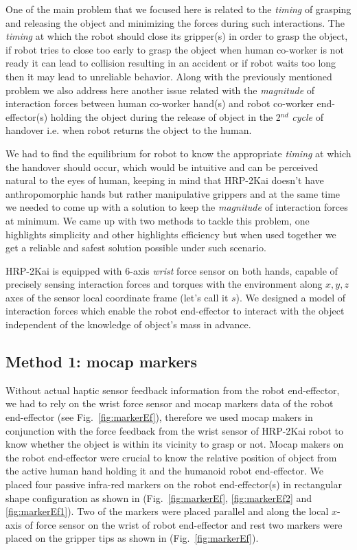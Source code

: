 One of the main problem that we focused here is related to the \textit{timing} of grasping and releasing the object and minimizing the forces during such interactions. The \textit{timing} at which the robot should close its gripper(s) in order to grasp the object, if robot tries to close too early to grasp the object when human co-worker is not ready it can lead to collision resulting in an accident or if robot waits too long then it may lead to unreliable behavior. Along with the previously mentioned problem we also address here another issue related with the \textit{magnitude} of interaction forces between human co-worker hand(s) and robot co-worker end-effector(s) holding the object during the release of object in the 2$^{nd}$ \textit{cycle} of handover i.e. when robot returns the object to the human.


We had to find the equilibrium for robot to know the appropriate \textit{timing} at which the handover should occur, which would be intuitive and can be perceived natural to the eyes of human, keeping in mind that HRP-2Kai doesn't have anthropomorphic hands but rather manipulative grippers and at the same time we needed to come up with a solution to keep the \textit{magnitude} of interaction forces at minimum. We came up with two methods to tackle this problem, one highlights simplicity and other highlights efficiency but when used together we get a reliable and safest solution possible under such scenario.


HRP-2Kai is equipped with 6-axis \textit{wrist} force sensor on both hands, capable of precisely sensing interaction forces and torques with the environment along $x, y, z$ axes of the sensor local coordinate frame (let's call it $s$). We designed a model of interaction forces which enable the robot end-effector to interact with the object independent of the knowledge of object's mass in advance.

\subsection{Method 1: mocap markers}

Without actual haptic sensor feedback information from the robot end-effector, we had to rely on the wrist force sensor and mocap markers data of the robot end-effector (see Fig.~\ref{fig:markerEf}), therefore we used mocap makers in conjunction with the force feedback from the wrist sensor of HRP-2Kai robot to know whether the object is within its vicinity to grasp or not. Mocap makers on the robot end-effector were crucial to know the relative position of object from the active human hand holding it and the humanoid robot end-effector. We placed four passive infra-red markers on the robot end-effector(s) in rectangular shape configuration as shown in (Fig.~\ref{fig:markerEf}, \ref{fig:markerEf2} and \ref{fig:markerEf1}). Two of the markers were placed parallel and along the local $x$-axis of force sensor on the wrist of robot end-effector and rest two markers were placed on the gripper tips as shown in (Fig.~\ref{fig:markerEf}).

